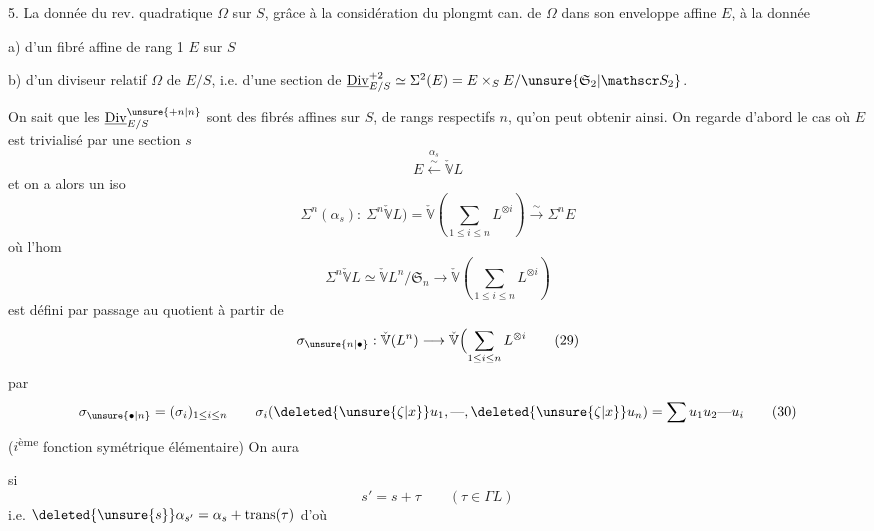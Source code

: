 5. La donnée du \deleted{\unsure{$\Omega$}} rev. quadratique $\Omega$ sur $S$,
grâce à la considération du plongmt can. de
$\Omega$ dans son enveloppe affine $E$,  à la donnée

a) d'un fibré affine de rang 1 $E$ sur $S$

b) d'un diviseur relatif  $\Omega$ de $E/S$,
i.e. d'une section de $\underline{\mathrm{Div}}^{+2}_{E/S}\simeq\Sigma^2(E)=E\times_S E/\unsure{\mathfrak S_2|\mathscr S_2}$.

On sait que  les $\underline{\mathrm{Div}}^{\unsure{+n|n}}_{E/S}$ 
sont des fibrés affines sur $S$, de rangs respectifs $n$, qu'on peut
obtenir ainsi. On regarde d'abord le cas où $E$
est trivialisé par une section $s$
\[
E\overset{\alpha_s}{\xleftarrow{\sim}}\check{\mathbb V}L \tag*{(27)}
\]
et on a alors un iso
\[
\Sigma^n(\alpha_s):\ \Sigma^n\check{\mathbb V}L)=\check{\mathbb V}\left(\sum_{1\le i\le n}L^{\otimes i}\right)\xrightarrow{\sim}\Sigma^n E
\]
où l'hom
\[
\Sigma^n\check{\mathbb V}L\simeq\check{\mathbb V}L^n/\mathfrak S_n\longrightarrow
 \check{\mathbb V}\left(\sum_{1\le i\le n}L^{\otimes i}\right) \tag*{(28)}
\]
est défini par passage au quotient à partir de
\[
\sigma_{\unsure{n|\bullet}}:\check{\mathbb V}(L^n)\longrightarrow
 \check{\mathbb V}\Bigl(\sum_{1\le i\le n}L^{\otimes i} \tag*{(29)}
\]
 par
\[
\sigma_{\unsure{\bullet|n}}=(\sigma_i)_{1\le i\le n}\qquad
\sigma_i(\deleted{\unsure{\zeta|x}}u_1,\text{---},\deleted{\unsure{\zeta|x}}u_n)=\sum u_1 u_2\text{---}u_i \tag*{(30)}
\]
($i$\textsuperscript{ème} fonction symétrique élémentaire) On aura

si
\[
s'=s+\tau\qquad(\tau\in\Gamma L)
\]
i.e. \qquad $\deleted{\unsure{s}}\alpha_{s'}=\alpha_s+\operatorname{trans}(\tau)$ \qquad d'où


